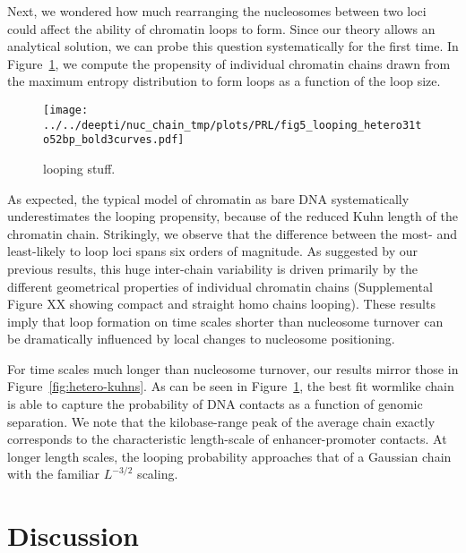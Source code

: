 \documentclass[%
 reprint,
superscriptaddress,
showpacs,preprintnumbers,
 amsmath,amssymb,
 aps,
 prl,
]{revtex4-1}
\begin{document}
Next, we wondered how much rearranging the nucleosomes between two
    loci could affect the ability of chromatin loops to form.
Since our theory allows an analytical solution, we can probe this question
    systematically for the first time.
In Figure~\ref{fig:looping}, we compute the propensity of individual chromatin
    chains drawn from the maximum entropy distribution to form loops as a
    function of the loop size.

\begin{figure}
    \centering
    \texttt{[image: ../../deepti/nuc\_chain\_tmp/plots/PRL/fig5\_looping\_hetero31to52bp\_bold3curves.pdf]}
    \caption{looping stuff.}\label{fig:looping}
\end{figure}

As expected, the typical model of chromatin as bare DNA systematically
    underestimates the looping propensity, because of the reduced Kuhn length of
    the chromatin chain.
Strikingly, we observe that the difference between the most- and least-likely to
    loop loci spans six orders of magnitude.
As suggested by our previous results, this huge inter-chain variability is
    driven primarily by the different geometrical properties of individual
    chromatin chains (Supplemental Figure XX showing compact and straight homo chains
    looping).
These results imply that loop formation on time scales shorter than nucleosome
    turnover can be dramatically influenced by local changes to nucleosome
    positioning.

For time scales much longer than nucleosome turnover, our results mirror those
    in Figure~\ref{fig:hetero-kuhns}.
As can be seen in Figure~\ref{fig:looping}, the best fit wormlike chain is able
    to capture the probability of DNA contacts as a function of genomic separation.
We note that the kilobase-range peak of the average chain exactly corresponds to
    the characteristic length-scale of enhancer-promoter contacts.
At longer length scales, the looping probability approaches that of a Gaussian
    chain with the familiar $L^{-3/2}$ scaling.

\section{\label{sec:discussion}Discussion}
\end{document}
